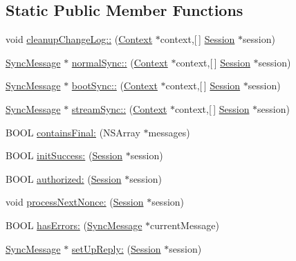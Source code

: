 \subsection*{\-Static \-Public \-Member \-Functions}
\begin{DoxyCompactItemize}
\item 
void \hyperlink{interface_sync_helper_a87a4d553d84a6af9a7ce1709656cc5ea}{cleanup\-Change\-Log\-::} (\hyperlink{interface_context}{\-Context} $\ast$context,\mbox{[}$\,$\mbox{]} \hyperlink{interface_session}{\-Session} $\ast$session)
\item 
\hyperlink{interface_sync_message}{\-Sync\-Message} $\ast$ \hyperlink{interface_sync_helper_a3d5feaaf51a1e2f3c4284219b6e6f522}{normal\-Sync\-::} (\hyperlink{interface_context}{\-Context} $\ast$context,\mbox{[}$\,$\mbox{]} \hyperlink{interface_session}{\-Session} $\ast$session)
\item 
\hyperlink{interface_sync_message}{\-Sync\-Message} $\ast$ \hyperlink{interface_sync_helper_a25614c8dc347b76f49d039c6577358eb}{boot\-Sync\-::} (\hyperlink{interface_context}{\-Context} $\ast$context,\mbox{[}$\,$\mbox{]} \hyperlink{interface_session}{\-Session} $\ast$session)
\item 
\hyperlink{interface_sync_message}{\-Sync\-Message} $\ast$ \hyperlink{interface_sync_helper_a296743c0ce82d3d03eadd32af6d9027e}{stream\-Sync\-::} (\hyperlink{interface_context}{\-Context} $\ast$context,\mbox{[}$\,$\mbox{]} \hyperlink{interface_session}{\-Session} $\ast$session)
\item 
\-B\-O\-O\-L \hyperlink{interface_sync_helper_a8d6011a5d33536808e7c1eddfbc66a0d}{contains\-Final\-:} (\-N\-S\-Array $\ast$messages)
\item 
\-B\-O\-O\-L \hyperlink{interface_sync_helper_a82eb407384a4e6fd80b763c9cc3bfc66}{init\-Success\-:} (\hyperlink{interface_session}{\-Session} $\ast$session)
\item 
\-B\-O\-O\-L \hyperlink{interface_sync_helper_a62a98066f665672a708cd665ad974815}{authorized\-:} (\hyperlink{interface_session}{\-Session} $\ast$session)
\item 
void \hyperlink{interface_sync_helper_a077fea806643f0327aea70bb8d94c387}{process\-Next\-Nonce\-:} (\hyperlink{interface_session}{\-Session} $\ast$session)
\item 
\-B\-O\-O\-L \hyperlink{interface_sync_helper_a512e8a3540b1e98b7b90a0064d034ee8}{has\-Errors\-:} (\hyperlink{interface_sync_message}{\-Sync\-Message} $\ast$current\-Message)
\item 
\hyperlink{interface_sync_message}{\-Sync\-Message} $\ast$ \hyperlink{interface_sync_helper_a21a293ea4849bd1eadd24d45d63a8d99}{set\-Up\-Reply\-:} (\hyperlink{interface_session}{\-Session} $\ast$session)

\end{DoxyCompactItemize}
